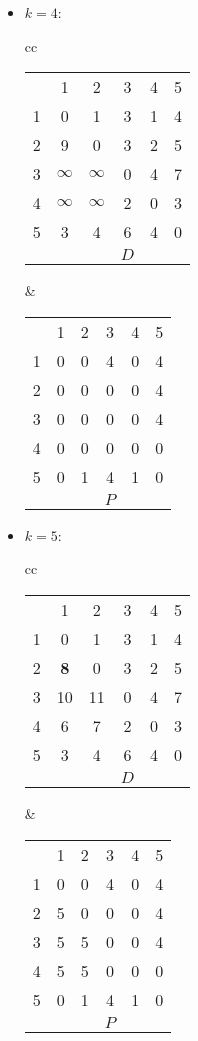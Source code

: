 \documentclass[natbib,12pt]{article}
\begin{document}
\begin{itemize}
					\item $k=4$:
\begin{tabular}{cc}
	\begin{tabular}{cccccc}
		& 1 & 2 & 3 & 4 & 5 \\ \cline{2-6} 
		\multicolumn{1}{l|}{1} & 0 & 1 & 3 & 1 & 4 \\
		\multicolumn{1}{l|}{2} & 9 & 0 & 3 & 2 & 5 \\
		\multicolumn{1}{l|}{3} & $\infty$ & $\infty$ & 0 & 4 & 7 \\
		\multicolumn{1}{l|}{4} & $\infty$ & $\infty$ & 2 & 0 & 3 \\
		\multicolumn{1}{l|}{5} & 3 & 4 & 6 & 4 & 0 \\
		&&&$D$&&
	\end{tabular}
	&
	\begin{tabular}{cccccc}
		& 1 & 2 & 3 & 4 & 5 \\ \cline{2-6} 
		\multicolumn{1}{l|}{1} & 0 & 0 & 4 & 0 & 4 \\
		\multicolumn{1}{l|}{2} & 0 & 0 & 0 & 0 & 4 \\
		\multicolumn{1}{l|}{3} & 0 & 0 & 0 & 0 & 4 \\
		\multicolumn{1}{l|}{4} & 0 & 0 & 0 & 0 & 0 \\
		\multicolumn{1}{l|}{5} & 0 & 1 & 4 & 1 & 0 \\
		&&&$P$&&
	\end{tabular}
\end{tabular}

\item $k=5$:
\begin{tabular}{cc}
	\begin{tabular}{cccccc}
		& 1 & 2 & 3 & 4 & 5 \\ \cline{2-6} 
		\multicolumn{1}{l|}{1} & 0 & 1 & 3 & 1 & 4 \\
		\multicolumn{1}{l|}{2} & \textbf{8} & 0 & 3 & 2 & 5 \\
		\multicolumn{1}{l|}{3} & 10 & 11 & 0 & 4 & 7 \\
		\multicolumn{1}{l|}{4} & 6 & 7 & 2 & 0 & 3 \\
		\multicolumn{1}{l|}{5} & 3 & 4 & 6 & 4 & 0 \\
		&&&$D$&&
	\end{tabular}
	&
	\begin{tabular}{cccccc}
		& 1 & 2 & 3 & 4 & 5 \\ \cline{2-6} 
		\multicolumn{1}{l|}{1} & 0 & 0 & 4 & 0 & 4 \\
		\multicolumn{1}{l|}{2} & 5 & 0 & 0 & 0 & 4 \\
		\multicolumn{1}{l|}{3} & 5 & 5 & 0 & 0 & 4 \\
		\multicolumn{1}{l|}{4} & 5 & 5 & 0 & 0 & 0 \\
		\multicolumn{1}{l|}{5} & 0 & 1 & 4 & 1 & 0 \\
		&&&$P$&&
	\end{tabular}
\end{tabular}
		
	\end{itemize}
\end{document}
